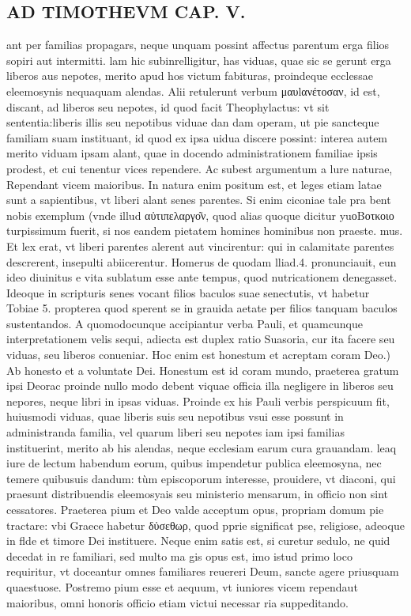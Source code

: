 \documentclass{article}
\begin{document}
\begin{pages}
\section*{AD TIMOTHEVM CAP. V. }
\marginpar{[ p.106 ]}\pstart ant per familias propagars, neque unquam possint affectus parentum erga filios sopiri aut intermitti. lam hic subinrelligitur, has viduas, quae sic se gerunt erga liberos aus nepotes, merito apud hos victum fabituras, proindeque ecclessae eleemosynis nequaquam alendas. Alii retulerunt verbum μαυlανέτοσαν, id est, discant, ad liberos seu nepotes, id quod facit Theophylactus: vt sit sententia:liberis illis seu nepotibus viduae dan dam operam, ut pie sancteque familiam suam instituant, id quod ex ipsa uidua discere possint: interea autem merito viduam ipsam alant, quae in docendo administrationem familiae ipsis prodest, et cui tenentur vices rependere. Ac subest argumentum a lure naturae, Rependant vicem maioribus. In natura enim positum est, et leges etiam latae sunt a sapientibus, vt liberi alant senes parentes. Si enim ciconiae tale pra bent nobis exemplum (vnde illud αὐτιπελαργο͂ν, quod alias quoque dicitur yuοΒοτκοιο turpissimum fuerit, si nos eandem pietatem homines hominibus non praeste. mus. Et lex erat, vt liberi parentes alerent aut vincirentur: qui in calamitate parentes descrerent, insepulti abiicerentur. Homerus de quodam lliad.4. pronunciauit, eun ideo diuinitus e vita sublatum esse ante tempus, quod nutricationem denegasset. Ideoque in scripturis senes vocant filios baculos suae senectutis, vt habetur Tobiae 5. propterea quod sperent se in grauida aetate per filios tanquam baculos sustentandos. A quomodocunque accipiantur verba Pauli, et quamcunque interpretationem velis sequi, adiecta est duplex ratio Suasoria, cur ita facere seu viduas, seu liberos conueniar.  \pend\pstart Hoc enim est honestum et acreptam coram Deo.) Ab honesto et a voluntate Dei. Honestum est id coram mundo, praeterea gratum ipsi Deorac proinde nullo modo debent viquae officia illa negligere in liberos seu nepores, neque libri in ipsas viduas. Proinde ex his Pauli verbis perspicuum fit, huiusmodi viduas, quae liberis suis seu nepotibus vsui esse possunt in administranda familia, vel quarum liberi seu nepotes iam ipsi familias instituerint, merito ab his alendas, neque ecclesiam earum cura grauandam. leaq iure de lectum habendum eorum, quibus impendetur publica eleemosyna, nec temere quibusuis dandum: tùm episcoporum interesse, prouidere, vt diaconi, qui praesunt distribuendis eleemosyais seu ministerio mensarum, in officio non sint cessatores. Praeterea pium et Deo valde acceptum opus, propriam domum pie tractare: vbi Graece habetur δὐσεθωρ, quod pprie significat pse, religiose, adeoque in flde et timore Dei instituere. Neque enim satis est, si curetur sedulo, ne quid decedat in re familiari, sed multo ma gis opus est, imo istud primo loco requiritur, vt doceantur omnes familiares reuereri Deum, sancte agere priusquam quaestuose. Postremo pium esse et aequum, vt iuniores vicem rependaut maioribus, omni honoris officio etiam victui necessar ria suppeditando.  \pend

\end{pages}
\end{document}
